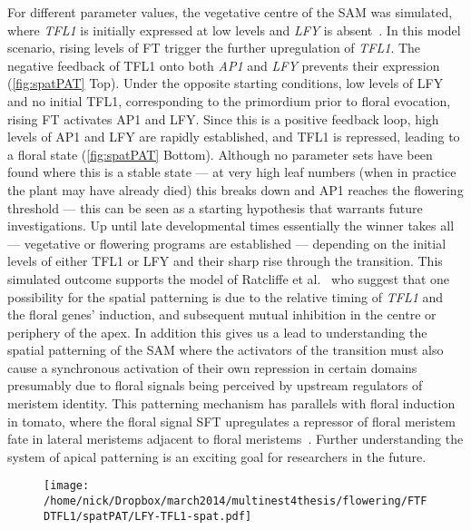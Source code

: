 For different parameter values, the vegetative centre of the SAM was simulated, where \emph{TFL1} is initially expressed at low levels and \emph{LFY} is absent~\cite{bradley1997,ratcliffe1998,ratcliffe1999}.
In this model scenario, rising levels of FT trigger the further upregulation of \emph{TFL1}.
The negative feedback of TFL1 onto both \emph{AP1} and \emph{LFY} prevents their expression (\autoref{fig:spatPAT} Top).
Under the opposite starting conditions, low levels of LFY and no initial TFL1, corresponding to the primordium prior to floral evocation, rising FT activates AP1 and LFY.
Since this is a positive feedback loop, high levels of AP1 and LFY are rapidly established, and TFL1 is repressed, leading to a floral state (\autoref{fig:spatPAT} Bottom).
Although no parameter sets have been found where this is a stable state --- at very high leaf numbers (when in practice the plant may have already died) this breaks down and AP1 reaches the flowering threshold --- this can be seen as a starting hypothesis that warrants future investigations.
Up until late developmental times essentially the winner takes all --- vegetative or flowering programs are established --- depending on the initial levels of either TFL1 or LFY and their sharp rise through the transition.
This simulated outcome supports the model of Ratcliffe et al.~\cite{ratcliffe1999} who suggest that one possibility for the spatial patterning is due to the relative timing of \emph{TFL1} and the floral genes' induction, and subsequent mutual inhibition in the centre or periphery of the apex.
In addition this gives us a lead to understanding the spatial patterning of the SAM where the activators of the transition must also cause a synchronous activation of their own repression in certain domains presumably due to floral signals being perceived by upstream regulators of meristem identity.
This patterning mechanism has parallels with floral induction in tomato, where the floral signal SFT upregulates a repressor of floral meristem fate in lateral meristems adjacent to floral meristems~\cite{thouet2012}.
Further understanding the system of apical patterning is an exciting goal for researchers in the future.

\begin{figure}[!htb]
\centering
\texttt{[image: /home/nick/Dropbox/march2014/multinest4thesis/flowering/FTFDTFL1/spatPAT/LFY-TFL1-spat.pdf]}
\end{figure}

